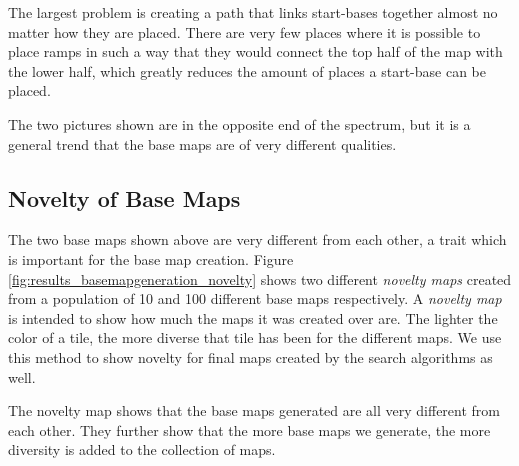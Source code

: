 The largest problem is creating a path that links start-bases together almost no matter how they are placed. There are very few places where it is possible to place ramps in such a way that they would connect the top half of the map with the lower half, which greatly reduces the amount of places a start-base can be placed.

The two pictures shown are in the opposite end of the spectrum, but it is a general trend that the base maps are of very different qualities. 

\subsection*{Novelty of Base Maps}

The two base maps shown above are very different from each other, a trait which is important for the base map creation. Figure \ref{fig:results_basemapgeneration_novelty} shows two different \textit{novelty maps} created from a population of 10 and 100 different base maps respectively. A \textit{novelty map} is intended to show how much the maps it was created over are. The lighter the color of a tile, the more diverse that tile has been for the different maps. We use this method to show novelty for final maps created by the search algorithms as well.


The novelty map shows that the base maps generated are all very different from each other. They further show that the more base maps we generate, the more diversity is added to the collection of maps.